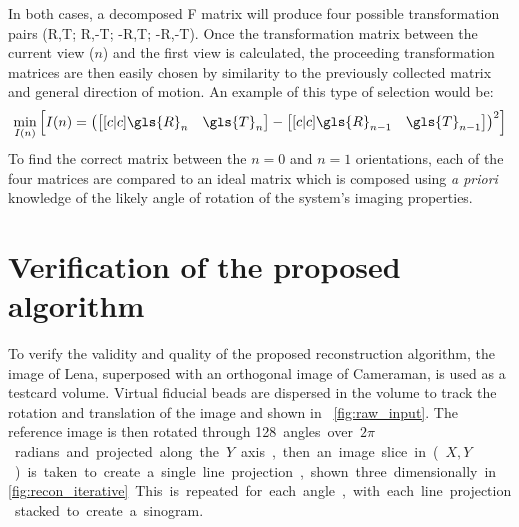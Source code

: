 \documentclass[times, twoside, watermark]{zHenriquesLab-StyleBioRxiv}
\begin{document}
In both cases, a decomposed \gls{F} matrix will produce four possible transformation pairs (\gls{R},\gls{T}; \gls{R},-\gls{T}; -\gls{R},\gls{T}; -\gls{R},-\gls{T}).
Once the transformation matrix between the current view (\(n\)) and the first view is calculated, the proceeding transformation matrices are then easily chosen by similarity to the previously collected matrix and general direction of motion.
An example of this type of selection would be:
\begin{align}
\min_{I(n)}\left[I(n) = \left(\begin{bmatrix}[c|c] \gls{R}_n&\gls{T}_n \end{bmatrix} - \begin{bmatrix}[c|c] \gls{R}_{n-1}&\gls{T}_{n-1} \end{bmatrix}\right)^2\right]
\end{align}
To find the correct matrix between the \(n=0\) and \(n=1\) orientations, each of the four matrices are compared to an ideal matrix which is composed using \emph{a priori} knowledge of the likely angle of rotation of the system's imaging properties.

\section{Verification of the proposed algorithm}

To verify the validity and quality of the proposed reconstruction algorithm, the image of Lena, superposed with an orthogonal image of Cameraman, is used as a testcard volume.
Virtual fiducial beads are dispersed in the volume to track the rotation and translation of the image and shown in \figurename~\ref{fig:raw_input}.
The reference image is then rotated through \SI{128} angles over \(2\pi \) radians and projected along the \(Y\) axis, then an image slice in (\(X,Y\)) is taken to create a single line projection, shown three dimensionally in \figurename~\ref{fig:recon_iterative}.
This is repeated for each angle,  with each line projection stacked to create a sinogram.%

\end{document}
